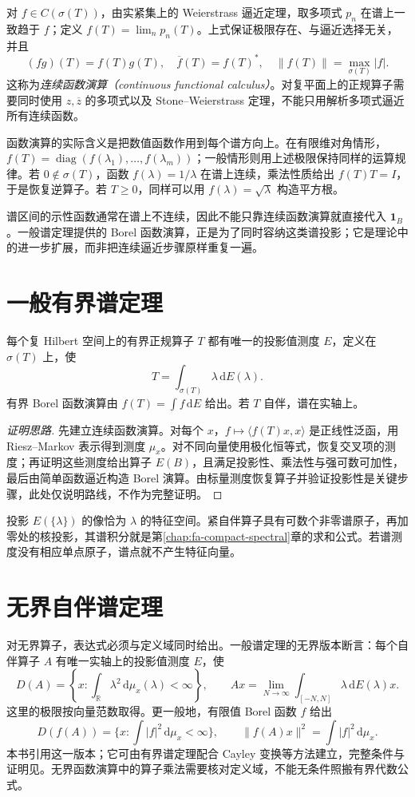 对 $f\in C(\sigma(T))$，由实紧集上的 Weierstrass 逼近定理，取多项式 $p_n$ 在谱上一致趋于 $f$；定义 $f(T)=\lim_np_n(T)$。上式保证极限存在、与逼近选择无关，并且
\[
 (fg)(T)=f(T)g(T),\quad \overline f(T)=f(T)^*,\quad
 \|f(T)\|=\max_{\sigma(T)}|f|.
\]
这称为\emph{连续函数演算（continuous functional calculus）}。对复平面上的正规算子需要同时使用 $z,\overline z$ 的多项式以及 Stone--Weierstrass 定理，不能只用解析多项式逼近所有连续函数。

函数演算的实际含义是把数值函数作用到每个谱方向上。在有限维对角情形，$f(T)=\operatorname{diag}(f(\lambda_1),\ldots,f(\lambda_m))$；一般情形则用上述极限保持同样的运算规律。若 $0\notin\sigma(T)$，函数 $f(\lambda)=1/\lambda$ 在谱上连续，乘法性质给出 $f(T)T=I$，于是恢复逆算子。若 $T\geq0$，同样可以用 $f(\lambda)=\sqrt\lambda$ 构造平方根。

谱区间的示性函数通常在谱上不连续，因此不能只靠连续函数演算就直接代入 $\mathbf1_B$。一般谱定理提供的 Borel 函数演算，正是为了同时容纳这类谱投影；它是理论中的进一步扩展，而非把连续逼近步骤原样重复一遍。

\section{一般有界谱定理}
\begin{theorem}\label{thm:fa-general-spectral}
每个复 Hilbert 空间上的有界正规算子 $T$ 都有唯一的投影值测度 $E$，定义在 $\sigma(T)$ 上，使
\begin{equation}
 T=\int_{\sigma(T)}\lambda\,\mathrm dE(\lambda).
 \label{eq:fa-general-spectral-integral}
\end{equation}
有界 Borel 函数演算由 $f(T)=\int f\,\mathrm dE$ 给出。若 $T$ 自伴，谱在实轴上。
\end{theorem}
\begin{proof}[证明思路]
先建立连续函数演算。对每个 $x$，$f\mapsto\langle f(T)x,x\rangle$ 是正线性泛函，用 Riesz--Markov 表示得到测度 $\mu_x$。对不同向量使用极化恒等式，恢复交叉项的测度；再证明这些测度给出算子 $E(B)$，且满足投影性、乘法性与强可数可加性，最后由简单函数逼近构造 Borel 演算。由标量测度恢复算子并验证投影性是关键步骤，此处仅说明路线，不作为完整证明。
\end{proof}
投影 $E(\{\lambda\})$ 的像恰为 $\lambda$ 的特征空间。紧自伴算子具有可数个非零谱原子，再加零处的核投影，其谱积分就是第\ref{chap:fa-compact-spectral}章的求和公式。若谱测度没有相应单点原子，谱点就不产生特征向量。

\section{无界自伴谱定理}
对无界算子，表达式必须与定义域同时给出。一般谱定理的无界版本断言：每个自伴算子 $A$ 有唯一实轴上的投影值测度 $E$，使
\[
 D(A)=\left\{x:\int_{\mathbb R}\lambda^2\,\mathrm d\mu_x(\lambda)<\infty\right\},
 \qquad Ax=\lim_{N\to\infty}\int_{[-N,N]}\lambda\,\mathrm dE(\lambda)x.
\]
这里的极限按向量范数取得。更一般地，有限值 Borel 函数 $f$ 给出
\[
 D(f(A))=\{x:\int|f|^2\,\mathrm d\mu_x<\infty\},\qquad
 \|f(A)x\|^2=\int|f|^2\,\mathrm d\mu_x.
\]
本书引用这一版本；它可由有界谱定理配合 Cayley 变换等方法建立，完整条件与证明见\cite{teschl}。无界函数演算中的算子乘法需要核对定义域，不能无条件照搬有界代数公式。

